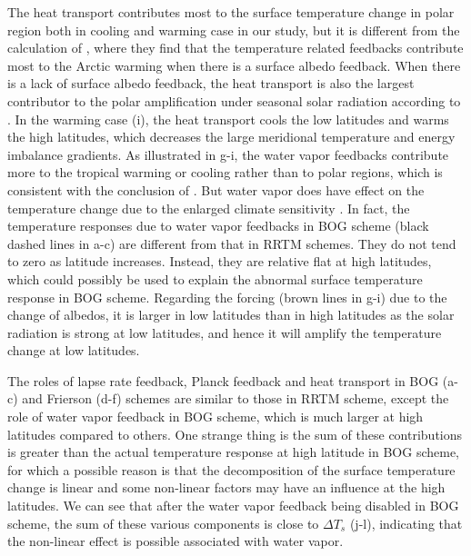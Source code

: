 The heat transport contributes most to the surface temperature change in polar region both in cooling and warming case in our study, but it is different from the calculation of \cite{Pithan2014}, where they find that the temperature related feedbacks contribute most to the Arctic warming when there is a surface albedo feedback. When there is a lack of surface albedo feedback, the heat transport is also the largest contributor to the polar amplification under seasonal solar radiation according to \cite{Kim2018}. In the warming case (i), the heat transport cools the low latitudes and warms the high latitudes, which decreases the large meridional temperature and energy imbalance gradients. As illustrated in g-i, the water vapor feedbacks contribute more to the tropical warming or cooling rather than to polar regions, which is consistent with the conclusion of \cite{Pithan2014}. But water vapor does have effect on the temperature change due to the enlarged climate sensitivity \citep{Langen2012}. In fact, the temperature responses due to water vapor feedbacks in BOG scheme (black dashed lines in a-c) are different from that in RRTM schemes. They do not tend to zero as latitude increases. Instead, they are relative flat at high latitudes, which could possibly be used to explain the abnormal surface temperature response in BOG scheme. Regarding the forcing (brown lines in g-i) due to the change of albedos, it is larger in low latitudes than in high latitudes as the solar radiation is strong at low latitudes, and hence it will amplify the temperature change at low latitudes.

The roles of lapse rate feedback, Planck feedback and heat transport in BOG (a-c) and Frierson (d-f) schemes are similar to those in RRTM scheme, except the role of water vapor feedback in BOG scheme, which is much larger at high latitudes compared to others. One strange thing is the sum of these contributions is greater than the actual temperature response at high latitude in BOG scheme, for which a possible reason is that the decomposition of the surface temperature change is linear and some non-linear factors may have an influence at the high latitudes. We can see that after the water vapor feedback being disabled in BOG scheme, the sum of these various components is close to $\Delta T_s$ (j-l), indicating that the non-linear effect is possible associated with water vapor. 


